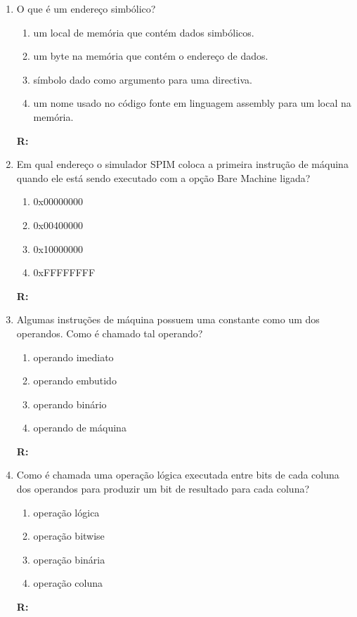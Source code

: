 \documentclass[a4paper,11pt]{article}
\begin{document}
\begin{enumerate}
    \item{O que é um endereço simbólico?}
        \begin{enumerate}
            \item{um local de memória que contém dados simbólicos.}
            \item{um byte na memória que contém o endereço de dados.}
            \item{símbolo dado como argumento para uma directiva.}
            \item{um nome usado no código fonte em linguagem assembly para um local na memória.}
        \end{enumerate}
        \textbf{R:}

    \item{Em qual endereço o simulador SPIM coloca a primeira instrução de máquina quando ele está sendo
            executado com a opção Bare Machine ligada?}
        \begin{enumerate}
            \item{0x00000000}
            \item{0x00400000}
            \item{0x10000000}
            \item{0xFFFFFFFF}
        \end{enumerate}
        \textbf{R:}

    \item{Algumas instruções de máquina possuem uma constante como um dos operandos. Como é chamado tal
            operando?}
        \begin{enumerate}
            \item{operando imediato}
            \item{operando embutido}
            \item{operando binário}
            \item{operando de máquina}
        \end{enumerate}
        \textbf{R:}
        
    \item{Como é chamada uma operação lógica executada entre bits de cada coluna dos operandos para
            produzir um bit de resultado para cada coluna?}
        \begin{enumerate}
            \item{operação lógica}
            \item{operação bitwise}
            \item{operação binária}
            \item{operação coluna}
        \end{enumerate}
        \textbf{R: }


\end{enumerate}
\end{document}
